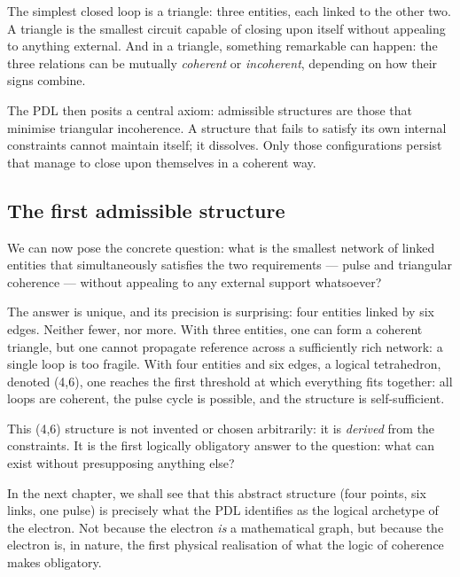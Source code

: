 \documentclass[11pt, a4paper, openright]{book}
\begin{document}
\medskip

The simplest closed loop is a triangle: three entities, each linked to the other two. A triangle is the smallest circuit capable of closing upon itself without appealing to anything external. And in a triangle, something remarkable can happen: the three relations can be mutually \emph{coherent} or \emph{incoherent}, depending on how their signs combine.

\medskip

The PDL then posits a central axiom: admissible structures are those that minimise triangular incoherence. A structure that fails to satisfy its own internal constraints cannot maintain itself; it dissolves. Only those configurations persist that manage to close upon themselves in a coherent way.

\subsection*{The first admissible structure}

We can now pose the concrete question: what is the smallest network of linked entities that simultaneously satisfies the two requirements — pulse and triangular coherence — without appealing to any external support whatsoever?

\medskip

The answer is unique, and its precision is surprising: four entities linked by six edges. Neither fewer, nor more. With three entities, one can form a coherent triangle, but one cannot propagate reference across a sufficiently rich network: a single loop is too fragile. With four entities and six edges, a logical tetrahedron, denoted (4,6), one reaches the first threshold at which everything fits together: all loops are coherent, the pulse cycle is possible, and the structure is self-sufficient.

\medskip

This (4,6) structure is not invented or chosen arbitrarily: it is \emph{derived} from the constraints. It is the first logically obligatory answer to the question: what can exist without presupposing anything else?

\medskip

In the next chapter, we shall see that this abstract structure (four points, six links, one pulse) is precisely what the PDL identifies as the logical archetype of the electron. Not because the electron \emph{is} a mathematical graph, but because the electron is, in nature, the first physical realisation of what the logic of coherence makes obligatory.
\end{document}
